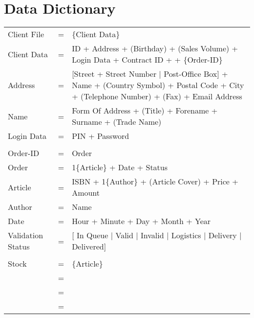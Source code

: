 \documentclass[12pt,a4paper]{article}
\begin{document}

\section{Data Dictionary}

\begin{comment}

Required Data (top level)
------------------------
Client File
Order
Stock

\end{comment}

\begin{tabular}{p{4cm}p{0.5cm}p{8cm}}
Client File & = & \{Client Data\} \\
Client Data & = & ID + Address + (Birthday) + (Sales Volume) + Login Data + Contract ID +  + \{Order-ID\}\\
Address & = & [Street + Street Number $|$ Post-Office Box] + Name +  (Country Symbol) +  Postal Code + City + (Telephone Number) + (Fax) + Email Address\\
Name & = & Form Of Address + (Title) + Forename + Surname + (Trade Name)\\
Login Data & = & PIN + Password \\
\\
Order-ID & = & Order \\
Order & = & 1\{Article\} + Date + Status\\
Article & = & ISBN + 1\{Author\} + (Article Cover) + Price +  Amount\\
Author & = & Name \\
Date & = & Hour + Minute + Day + Month + Year\\
Validation Status & = & [ In Queue $|$ Valid $|$ Invalid $|$ Logistics $|$ Delivery $|$ Delivered] \\
\\
Stock & = & \{Article\} \\
& = &  \\
& = &  \\
& = &  \\
\end{tabular}
\end{document}
